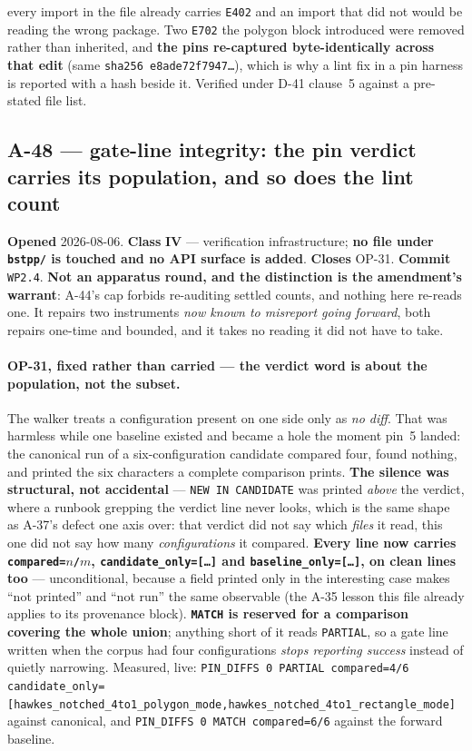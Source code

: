 \documentclass[
  10pt,
]{article}
\begin{document}
every import in the file already carries \texttt{E402} and an import that did not would be reading the wrong package. Two \texttt{E702} the polygon block introduced were removed rather than inherited, and \textbf{the pins re-captured byte-identically across that edit} (same \texttt{sha256 e8ade72f7947\dots}), which is why a lint fix in a pin harness is reported with a hash beside it. Verified under D-41 clause~5 against a pre-stated file list.

\hypertarget{a-48}{%
\subsection{A-48 --- gate-line integrity: the pin verdict carries its population, and so does the lint count}\label{a-48}}

\textbf{Opened} 2026-08-06. \textbf{Class} \textbf{IV} --- verification infrastructure; \textbf{no file under \texttt{bstpp/} is touched and no API surface is added}. \textbf{Closes} OP-31. \textbf{Commit} \texttt{WP2.4}. \textbf{Not an apparatus round, and the distinction is the amendment's warrant}: A-44's cap forbids re-auditing settled counts, and nothing here re-reads one. It repairs two instruments \emph{now known to misreport going forward}, both repairs one-time and bounded, and it takes no reading it did not have to take.

\paragraph{OP-31, fixed rather than carried --- the verdict word is about the population, not the subset.}
The walker treats a configuration present on one side only as \emph{no diff}. That was harmless while one baseline existed and became a hole the moment pin~5 landed: the canonical run of a six-configuration candidate compared four, found nothing, and printed the six characters a complete comparison prints. \textbf{The silence was structural, not accidental} --- \texttt{NEW IN CANDIDATE} was printed \emph{above} the verdict, where a runbook grepping the verdict line never looks, which is the same shape as A-37's defect one axis over: that verdict did not say which \emph{files} it read, this one did not say how many \emph{configurations} it compared. \textbf{Every line now carries \texttt{compared=$n$/$m$}, \texttt{candidate\_only=[\dots]} and \texttt{baseline\_only=[\dots]}, on clean lines too} --- unconditional, because a field printed only in the interesting case makes ``not printed'' and ``not run'' the same observable (the A-35 lesson this file already applies to its provenance block). \textbf{\texttt{MATCH} is reserved for a comparison covering the whole union}; anything short of it reads \texttt{PARTIAL}, so a gate line written when the corpus had four configurations \emph{stops reporting success} instead of quietly narrowing. Measured, live: \texttt{PIN\_DIFFS 0 PARTIAL compared=4/6 candidate\_only=[hawkes\_notched\_4to1\_polygon\_mode,\allowbreak{}hawkes\_notched\_4to1\_rectangle\_mode]} against canonical, and \texttt{PIN\_DIFFS 0 MATCH compared=6/6} against the forward baseline.
\end{document}
